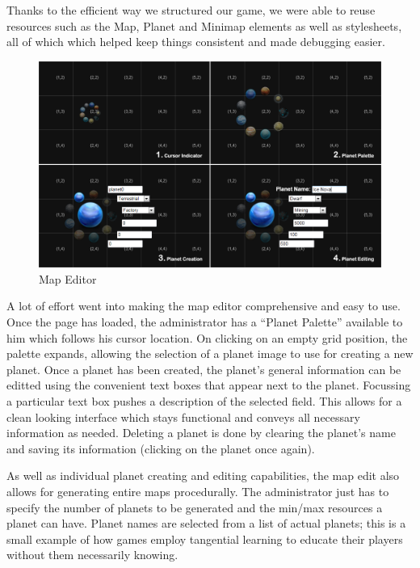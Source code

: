 \documentclass[a4paper,11pt]{article}
\begin{document}
		Thanks to the efficient way we structured our game, we were able to reuse resources such as the Map, Planet and Minimap elements as well as stylesheets, all of which which helped keep things consistent and made debugging easier.
		
		\begin{figure}[htb]
		\begin{center}
		\leavevmode
		\includegraphics[scale=0.6]{mapedit.png}
		\end{center}
		\caption{Map Editor}
		\label{fig:mapedit}
		\end{figure}

		A lot of effort went into making the map editor comprehensive and easy to use. Once the page has loaded, the administrator has a ``Planet Palette'' available to him which follows his cursor location. On clicking on an empty grid position, the palette expands, allowing the selection of a planet image to use for creating a new planet. Once a planet has been created, the planet's general information can be editted using the convenient text boxes that appear next to the planet. Focussing a particular text box pushes a description of the selected field. This allows for a clean looking interface which stays functional and conveys all necessary information as needed. Deleting a planet is done by clearing the planet's name and saving its information (clicking on the planet once again).

		As well as individual planet creating and editing capabilities, the map edit also allows for generating entire maps procedurally. The administrator just has to specify the number of planets to be generated and the min/max resources a planet can have. Planet names are selected from a list of actual planets; this is a small example of how games employ tangential learning to educate their players without them necessarily knowing.
\end{document}
